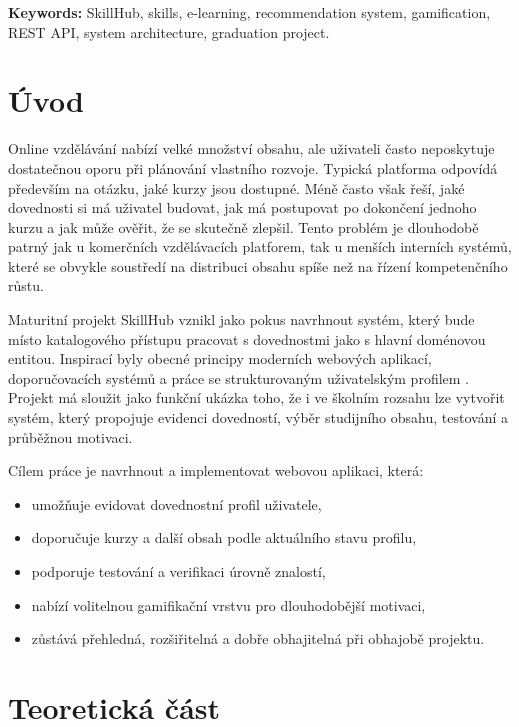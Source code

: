 \documentclass[12pt,a4paper]{report}
\begin{document}
\vspace{0.7cm}
\noindent\textbf{Keywords:} SkillHub, skills, e-learning, recommendation system, gamification, REST API, system architecture, graduation project.

\clearpage
\begingroup
\small
{}
\tableofcontents
\endgroup
\clearpage
\hypersetup{pageanchor=true}
\setcounter{page}{8}

\chapter*{Úvod}
Online vzdělávání nabízí velké množství obsahu, ale uživateli často neposkytuje dostatečnou oporu při plánování vlastního rozvoje. Typická platforma odpovídá především na otázku, jaké kurzy jsou dostupné. Méně často však řeší, jaké dovednosti si má uživatel budovat, jak má postupovat po dokončení jednoho kurzu a jak může ověřit, že se skutečně zlepšil. Tento problém je dlouhodobě patrný jak u komerčních vzdělávacích platforem, tak u menších interních systémů, které se obvykle soustředí na distribuci obsahu spíše než na řízení kompetenčního růstu.

Maturitní projekt SkillHub vznikl jako pokus navrhnout systém, který bude místo katalogového přístupu pracovat s dovednostmi jako s hlavní doménovou entitou. Inspirací byly obecné principy moderních webových aplikací, doporučovacích systémů a práce se strukturovaným uživatelským profilem \cite{next,react,express,reimers}. Projekt má sloužit jako funkční ukázka toho, že i ve školním rozsahu lze vytvořit systém, který propojuje evidenci dovedností, výběr studijního obsahu, testování a průběžnou motivaci.

Cílem práce je navrhnout a implementovat webovou aplikaci, která:
\begin{itemize}
  \item umožňuje evidovat dovednostní profil uživatele,
  \item doporučuje kurzy a další obsah podle aktuálního stavu profilu,
  \item podporuje testování a verifikaci úrovně znalostí,
  \item nabízí volitelnou gamifikační vrstvu pro dlouhodobější motivaci,
  \item zůstává přehledná, rozšiřitelná a dobře obhajitelná při obhajobě projektu.
\end{itemize}

\chapter{Teoretická část}
\end{document}
